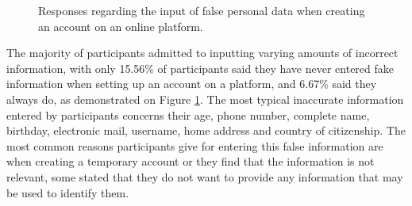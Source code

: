 \begin{figure}
    \begin{center}
        \caption{Responses regarding the input of false personal data when creating an account on an online platform.}
        \label{fig:creating_account_false_data}
    \end{center}
\end{figure}

The majority of participants admitted to inputting varying amounts of
incorrect information, with only 15.56\% of participants said they have
never entered fake information when setting up an account on a platform,
and 6.67\% said they always do, as demonstrated on Figure \ref{fig:creating_account_false_data}. The most typical inaccurate information
entered by participants concerns their age, phone number, complete name,
birthday, electronic mail, username, home address and country of citizenship.
The most common reasons participants give for entering this false
information are when creating a temporary account or they
find that the information is not relevant, some stated that they do
not want to provide any information that may be used to identify them.


